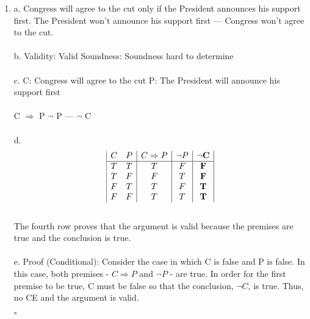 \documentclass[]{article}
\begin{document}
\begin{enumerate}
    \item a.
    \newline Congress will agree to the cut only if the President announces his support first.
    \newline
    The President won't announce his support first
    \newline
    ---
    \newline
    Congress won't agree to the cut.
    \\\\b.
    Validity: Valid
    \newline
    Soundness: Soundness hard to determine
    \\\\c.
    \newline C: Congress will agree to the cut
    \newline P: The President will announce his support first
    \\\\ C $\Rightarrow$ P
    \newline $\neg$ P
    \newline ---
    \newline $\neg$ C
    \\\\d.
    \begin{displaymath}
    \begin{array}{|c c|c|c|c|}
    C & P & C \Rightarrow P & \neg P & \neg \textbf{C}\\ %
    \hline %
    T & T & T & F & \textbf{F}\\
    T & F & F & T & \textbf{F}\\
    F & T & T & F & \textbf{T}\\
    F & F & T & T & \textbf{T}\\
    \end{array}
    \end{displaymath}
    \\The fourth row proves that the argument is valid because the premises are true and the conclusion is true.
    \\\\e.
    \newline Proof (Conditional):
    \newline Consider the case in which C is false and P is false. In this case, both premises - $C \Rightarrow P$ and $\neg P$ - are true. In order for the first premise to be true, C must be false so that the conclusion, $\neg C$, is true. Thus, no CE and the argument is valid.
    \begin{flushright}
    $\square$
    \end{flushright}
    

\end{enumerate}
\end{document}
